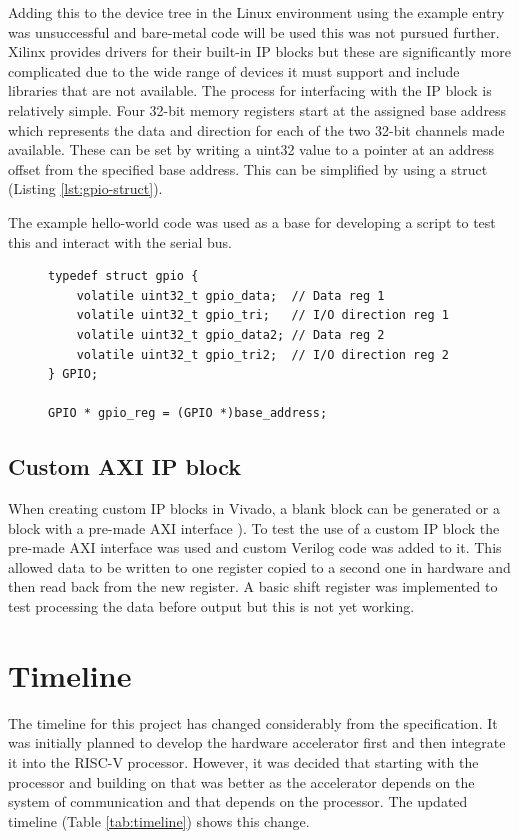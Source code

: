 Adding this to the device tree in the Linux environment using the example entry was unsuccessful and bare-metal code will be used this was not pursued further. Xilinx provides drivers \cite{xilinx_gpio_driver} for their built-in IP blocks but these are significantly more complicated due to the wide range of devices it must support and include libraries that are not available. The process for interfacing with the IP block is relatively simple. Four 32-bit memory registers start at the assigned base address which represents the data and direction for each of the two 32-bit channels made available. These can be set by writing a uint32 value to a pointer at an address offset from the specified base address. This can be simplified by using a struct (Listing \ref{lst:gpio-struct}).

The example hello-world code was used as a base for developing a script to test this and interact with the serial bus.

\begin{figure}[h]
\begin{lstlisting}[style=CStyle, caption={Definition of a structure to access virtual memory addresses.}, label={lst:gpio-struct}]
typedef struct gpio {
	volatile uint32_t gpio_data;  // Data reg 1
	volatile uint32_t gpio_tri;   // I/O direction reg 1
	volatile uint32_t gpio_data2; // Data reg 2
	volatile uint32_t gpio_tri2;  // I/O direction reg 2
} GPIO;

GPIO * gpio_reg = (GPIO *)base_address;
\end{lstlisting}
\end{figure}

\subsection{Custom AXI IP block}
When creating custom IP blocks in Vivado, a blank block can be generated or a block with a pre-made AXI interface \cite{xilinx_axiip}). To test the use of a custom IP block the pre-made AXI interface was used and custom Verilog code was added to it. This allowed data to be written to one register copied to a second one in hardware and then read back from the new register. A basic shift register was implemented to test processing the data before output but this is not yet working.

\section{Timeline}
The timeline for this project has changed considerably from the specification. It was initially planned to develop the hardware accelerator first and then integrate it into the RISC-V processor. However, it was decided that starting with the processor and building on that was better as the accelerator depends on the system of communication and that depends on the processor. The updated timeline (Table \ref{tab:timeline}) shows this change.

